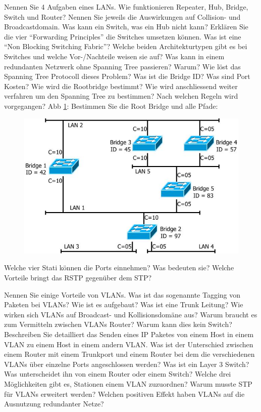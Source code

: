 \documentclass[ngerman,a4paper,12pt]{scrreprt}
\begin{document}
\olR
	\li Nennen Sie 4 Aufgaben eines LANs.
	\li Wie funktionieren Repeater, Hub, Bridge, Switch und Router? Nennen Sie jeweils die Auswirkungen auf Collision- und Broadcastdomain.
	\li Was kann ein Switch, was ein Hub nicht kann?
	\li Erklären Sie die vier "`Forwarding Principles"' die Switches umsetzen können.
	\li Was ist eine "`Non Blocking Switching Fabric"'?
	\li Welche beiden Architekturtypen gibt es bei Switches und welche Vor-/Nachteile weisen sie auf?
\olS
{}
\olR
	\li Was kann in einem redundanten Netzwerk ohne Spanning Tree passieren? Warum? Wie löst das Spanning Tree Protocoll dieses Problem?
	\li Was ist die Bridge ID? Was sind Port Kosten?
	\li Wie wird die Rootbridge bestimmt? Wie wird anschliessend weiter verfahren um den Spanning Tree zu bestimmen? Nach welchen Regeln wird vorgegangen?
	\li Abb \ref{stpex1}: Bestimmen Sie die Root Bridge und alle Pfade:
	\begin{figure}[H]
		\centering
		\includegraphics[scale=0.60]{img/R4.1.jpg}
		\caption{}
		\label{stpex1}
	\end{figure}
	\li Welche vier Stati können die Ports einnehmen? Was bedeuten sie?
	\li Welche Vorteile bringt das RSTP gegenüber dem STP?
\olS


\olR
	\li Nennen Sie einige Vorteile von VLANs.
	\li Was ist das sogenannte Tagging von Paketen bei VLANs? Wie ist es aufgebaut?
	\li Was ist eine Trunk Leitung?
	\li Wie wirken sich VLANs auf Broadcast- und Kollisionsdomäne aus?
	\li Warum braucht es zum Vermitteln zwischen VLANs Router? Warum kann dies kein Switch?
	\li Beschreiben Sie detailliert das Senden eines IP Paketes von einem Host in einem VLAN zu einem Host in einem andern VLAN.
	\li Was ist der Unterschied zwischen einem Router mit einem Trunkport und einem Router bei dem die verschiedenen VLANs über einzelne Ports angeschlossen werden?
	\li Was ist ein Layer 3 Switch? Was unterscheidet ihn von einem Router oder einem Switch?
	\li Welche drei Möglichkeiten gibt es, Stationen einem VLAN zuzuordnen?
	\li  Warum musste STP für VLANs erweitert werden? Welchen positiven Effekt haben VLANs auf die Ausnutzung redundanter Netze?
\olS
\end{document}

